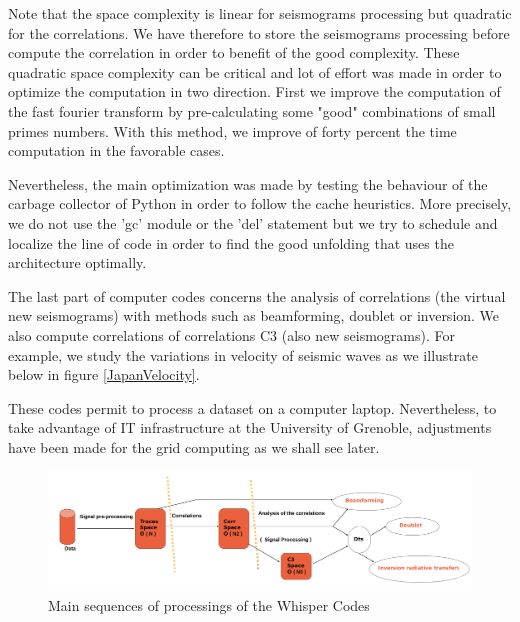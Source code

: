 \documentclass[a4paper, 10pt]{article}
\begin{document}
\begin{multicols}{2}
Note that the space complexity is linear for seismograms processing but quadratic for the correlations. We have therefore to store the seismograms processing before compute the correlation in order to benefit of the good complexity.
These quadratic space complexity can be critical and lot of effort was made in order to optimize the computation in two direction. First we improve the computation of the fast fourier transform by pre-calculating some "good" combinations of small primes numbers. 
With this method, we improve of forty percent the time computation in the favorable cases.

Nevertheless, the main optimization was made by testing the behaviour of the carbage collector of Python in order to follow the cache heuristics. More precisely, we do not use the 'gc' module or the 'del' statement but we try to schedule and localize the line of code in order to find the good unfolding that uses the architecture optimally.

The last part of computer codes concerns the analysis of correlations (the virtual new seismograms) with methods such as beamforming, doublet or inversion.
We also compute correlations of correlations C3 (also new seismograms). For example, we study the variations
in velocity of seismic waves as we illustrate below in figure \ref{JapanVelocity}. 

These codes permit to process a dataset on a computer laptop. 
Nevertheless, to take advantage of IT infrastructure at the University of Grenoble, 
adjustments have been made for the grid computing as we shall see later.

\end{multicols}
\begin{figure}[h]
\centering
\caption{\label{whisperGeneralWorflow} Main sequences of processings of the Whisper Codes}
\includegraphics[width=16cm]{briandPosterAGU2013GimpProcessing.png}
\end{figure}
\end{document}
